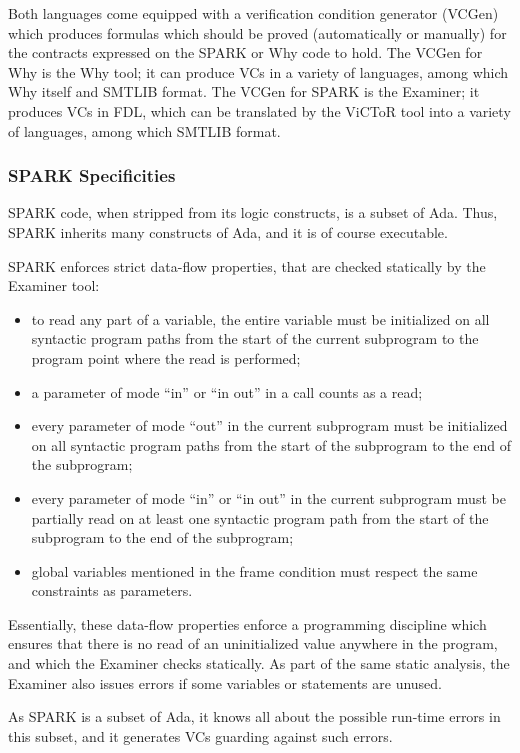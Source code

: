 \documentclass{article}
\begin{document}
Both languages come equipped with a verification condition generator (VCGen)
which produces formulas which should be proved (automatically or manually) for
the contracts expressed on the SPARK or Why code to hold. The VCGen for Why is
the Why tool; it can produce VCs in a variety of languages, among which Why
itself and SMTLIB format.  The VCGen for SPARK is the Examiner; it produces VCs
in FDL, which can be translated by the ViCToR tool into a variety of languages,
among which SMTLIB format.

\subsubsection{SPARK Specificities}

SPARK code, when stripped from its logic constructs, is a subset of
Ada. Thus, SPARK inherits many constructs of Ada, and it is of course
executable.

SPARK enforces strict data-flow properties, that are checked statically by the
Examiner tool:
\begin{itemize}
\item to read any part of a variable, the entire variable must be initialized
  on all syntactic program paths from the start of the current subprogram to
  the program point where the read is performed;
\item a parameter of mode ``in'' or ``in out'' in a call counts as a read;
\item every parameter of mode ``out'' in the current subprogram must be
  initialized on all syntactic program paths from the start of the subprogram
  to the end of the subprogram;
\item every parameter of mode ``in'' or ``in out'' in the current subprogram
  must be partially read on at least one syntactic program path from the start
  of the subprogram to the end of the subprogram;
\item global variables mentioned in the frame condition must respect the same
  constraints as parameters.
\end{itemize}

Essentially, these data-flow properties enforce a programming discipline which
ensures that there is no read of an uninitialized value anywhere in the
program, and which the Examiner checks statically.  As part of the same static
analysis, the Examiner also issues errors if some variables or statements are
unused.

As SPARK is a subset of Ada, it knows all about the possible run-time errors in
this subset, and it generates VCs guarding against such errors.
\end{document}
